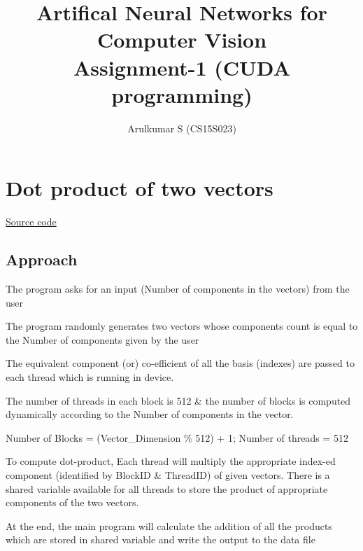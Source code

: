 \documentclass[]{article}
\begin{document}
	\title{Artifical Neural Networks for Computer Vision \\ Assignment-1 (CUDA programming)}
	\author{Arulkumar S (CS15S023)}
	\maketitle

    \section{Dot product of two vectors}
    
    \href{./VectorMultiply.cu}{Source code}
    
    \subsection{Approach}
    
    \begin{list}{*}{}
    	\item The program asks for an input (Number of components in the vectors) from the user
    	
    	\item The program randomly generates two vectors whose components count is equal to the Number of components given by the user
    	
      	\item  The equivalent component (or) co-efficient of all the basis (indexes) are passed to each thread which is running in device.
      	
    	\item The number of threads in each block is 512 \& the number of blocks is computed dynamically according to the Number of components in the vector. \newline
    	
    	Number of Blocks = (Vector\_Dimension \% 512) + 1; \newline
    	Number of threads = 512
    	
		\item To compute dot-product, Each thread will multiply the appropriate index-ed component (identified by BlockID \& ThreadID) of given vectors.
		There is a shared variable available for all threads to store the product of appropriate components of the two vectors. 
		      
		\item At the end, the main program will calculate the addition of all the products which are stored in shared variable and write the output to the data file
		
    \end{list}
    
\end{document}
